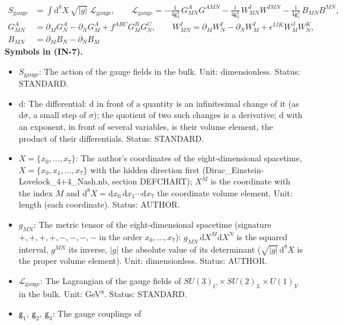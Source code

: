 \documentclass[
  10pt,
]{article}
\providecommand{\tightlist}{%
  \setlength{\itemsep}{0pt}\setlength{\parskip}{0pt}}
\begin{document}
\[
\begin{aligned}
S_{\mathrm{gauge}} &= \int\mathrm{d}^8X\,\sqrt{\lvert g\rvert}\;\mathcal{L}_{\mathrm{gauge}},\qquad
\mathcal{L}_{\mathrm{gauge}} = -\frac{1}{4\mathsf{g}_3^2}\,G^A_{MN}G^{AMN} - \frac{1}{4\mathsf{g}_2^2}\,W^I_{MN}W^{IMN}
 - \frac{1}{4\mathsf{g}_1^2}\,B_{MN}B^{MN},\\
G^A_{MN} &= \partial_MG^A_N - \partial_NG^A_M + f^{ABC}G^B_MG^C_N,\qquad
W^I_{MN} = \partial_MW^I_N - \partial_NW^I_M + \epsilon^{IJK}W^J_MW^K_N,\\
B_{MN} &= \partial_MB_N - \partial_NB_M
\end{aligned} \tag{IN-7}
\] \textbf{Symbols in (IN-7).}

\begin{itemize}
\tightlist
\item
  \(S_{\mathrm{gauge}}\): The action of the gauge fields in the bulk.
  Unit: dimensionless. Status: STANDARD.
\item
  \(\mathrm{d}\): The differential: \(\mathrm{d}\) in front of a
  quantity is an infinitesimal change of it (as \(\mathrm{d}\sigma\), a
  small step of \(\sigma\)); the quotient of two such changes is a
  derivative; \(\mathrm{d}\) with an exponent, in front of several
  variables, is their volume element, the product of their
  differentials. Status: STANDARD.
\item
  \(X = \{x_0, \dots, x_7\}\): The author's coordinates of the
  eight-dimensional spacetime, \(X = \{x_0, x_1, \dots, x_7\}\) with the
  hidden direction first (Dirac\_Einstein-Lovelock\_4+4\_Nash.nb,
  section DEFCHART); \(X^M\) is the coordinate with the index \(M\) and
  \(\mathrm{d}^8X = \mathrm{d}x_0\,\mathrm{d}x_1\cdots\mathrm{d}x_7\)
  the coordinate volume element. Unit: length (each coordinate). Status:
  AUTHOR.
\item
  \(g_{MN}\): The metric tensor of the eight-dimensional spacetime
  (signature \(+,+,+,+,-,-,-,-\) in the order \(x_0, \dots, x_7\)):
  \(g_{MN}\,\mathrm{d}X^M\mathrm{d}X^N\) is the squared interval,
  \(g^{MN}\) its inverse, \(\lvert g\rvert\) the absolute value of its
  determinant (\(\sqrt{\lvert g\rvert}\,\mathrm{d}^8X\) is the proper
  volume element). Unit: dimensionless. Status: AUTHOR.
\item
  \(\mathcal{L}_{\mathrm{gauge}}\): The Lagrangian of the gauge fields
  of \(SU(3)_C\times SU(2)_L\times U(1)_Y\) in the bulk. Unit:
  GeV\(^8\). Status: STANDARD.
\item
  \(\mathsf{g}_1,\ \mathsf{g}_2,\ \mathsf{g}_3\): The gauge couplings of

\end{itemize}
\end{document}
